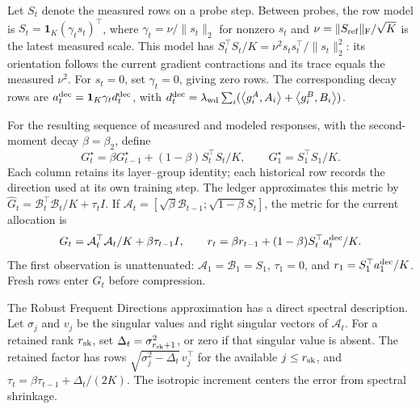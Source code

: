 Let $S_t$ denote the measured rows on a probe step. Between probes,
the row model is $S_t=\boldsymbol1_K(\gamma_ts_t)^\top$, where
$\gamma_t=\nu/\|s_t\|_2$ for nonzero $s_t$ and
$\nu=\|S_{\rm ref}\|_{\rm F}/\sqrt K$ is the latest measured
scale. This model has
$S_t^\top S_t/K=\nu^2s_ts_t^\top/\|s_t\|_2^2$:
its orientation follows the current gradient contractions and its
trace equals the measured $\nu^2$. For $s_t=0$, set $\gamma_t=0$, giving zero rows.
The corresponding decay rows are
$a_t^{\rm dec}=\boldsymbol1_K\gamma_td_t^{\rm dec}$, with
$d_t^{\rm dec}=\lambda_{\rm wd}\sum_i
(\left\langle g_i^A,A_i\right\rangle+\left\langle g_i^B,B_i\right\rangle)$.

For the resulting sequence of measured and modeled responses, with
the second-moment decay $\beta=\beta_2$, define
\begin{equation}
 G_t^\star=\beta G_{t-1}^\star+(1-\beta)S_t^\top S_t/K,
 \qquad G_1^\star=S_1^\top S_1/K.
 \label{eq:ledger-target}
\end{equation}
Each column retains its layer--group identity; each historical row
records the direction used at its own training step.
The ledger approximates this metric by
$\widehat G_t=\mathcal B_t^\top\mathcal B_t/K+\tau_t I$.
If
$\mathcal A_t=[\sqrt\beta\mathcal B_{t-1};\sqrt{1-\beta}S_t]$,
the metric for the current allocation is
\begin{equation}
 G_t=\mathcal A_t^\top\mathcal A_t/K+\beta\tau_{t-1}I,
 \qquad r_t=\beta r_{t-1}+(1-\beta)S_t^\top a_t^{\rm dec}/K.
 \label{eq:current-ledger-metric}
\end{equation}
The first observation is unattenuated:
$\mathcal A_1=\mathcal B_1=S_1$, $\tau_1=0$, and
$r_1=S_1^\top a_1^{\rm dec}/K$. Fresh rows enter $G_t$ before
compression.

The Robust Frequent Directions approximation
\citep{ghashami2016frequent,luo2019robust} has a direct spectral
description. Let $\sigma_j$ and $v_j$ be the singular values and
right singular vectors of $\mathcal A_t$. For a retained rank $r_{\rm sk}$,
set $\Delta_t=\sigma_{r_{\rm sk}+1}^2$, or zero if that singular value is
absent. The retained factor has rows
$\sqrt{\sigma_j^2-\Delta_t}\,v_j^\top$ for the available $j\leq r_{\rm sk}$,
and $\tau_t=\beta\tau_{t-1}+\Delta_t/(2K)$.
The isotropic increment centers the error from spectral shrinkage.

